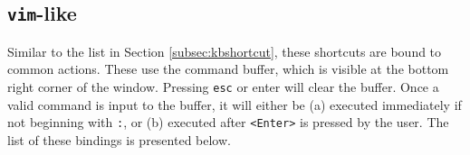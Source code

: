 \documentclass[english]{article}
\providecommand{\mi}[1]{\texttt{#1}}
\begin{document}
\newpage

\subsection{\mi{vim}-like}

Similar to the list in Section \textcolor{lcol}{\hyperref[subsec:kbshortcut]{\ref{subsec:kbshortcut}}}, these shortcuts are bound to common actions. These use the command 
buffer, which is visible at the bottom right corner of the window. Pressing \mi{esc} or enter will clear the buffer. Once a 
valid command is input to the buffer, it will either be (a) executed immediately if not beginning with \mi{:}, or 
(b) executed after \mi{<Enter>} is pressed by the user. The list of these bindings is presented below. 

\vspace{1em}
\end{document}
